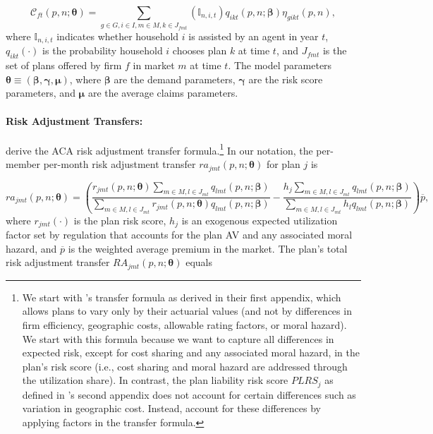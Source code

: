 \documentclass[12pt]{article}
\begin{document}
\vspace{-0.2in}		
\begin{equation*}
    \mathcal{C}_{ft}(\textit{p},\textit{n};\boldsymbol{\theta}) = \sum_{g \in G, i \in I, m\in M, k \in J_{fmt}} \left( \mathbb{I}_{n,i,t} \right)  q_{ikt}(\textit{p},\textit{n};\boldsymbol{\beta}) \eta_{gikt}(\textit{p},\textit{n}),
\end{equation*}
where $\mathbb{I}_{n,i,t}$ indicates whether household $i$ is assisted by an agent in year $t$, $q_{ikt}(\cdot)$ is the probability household $i$ chooses plan $k$ at time $t$, and $J_{fmt}$ is the set of plans offered by firm $f$ in market $m$ at time $t$.  The model parameters $\boldsymbol{\theta} \equiv (\boldsymbol{\beta},\boldsymbol{\gamma},\boldsymbol{\mu})$, where $\boldsymbol{\beta}$ are the demand parameters, $\boldsymbol{\gamma}$ are the risk score parameters, and $\boldsymbol{\mu}$ are the average claims parameters.


\paragraph{Risk Adjustment Transfers:} 
\citet{Pope2014} derive the ACA risk adjustment transfer formula.\footnote{We start with \citet{Pope2014}'s transfer formula as derived in their first appendix, which allows plans to vary only by their actuarial values (and not by differences in firm efficiency, geographic costs, allowable rating factors, or moral hazard).  We start with this formula because we want to capture all differences in expected risk, except for cost sharing and any associated moral hazard, in the plan's risk score (i.e., cost sharing and moral hazard are addressed through the utilization share).  In contrast, the plan liability risk score   $PLRS_j$ as defined in \citet{Pope2014}'s second appendix does not account for certain differences such as variation in geographic cost.  Instead, \citet{Pope2014} account for these differences by applying factors in the transfer formula.}  In our notation, the per-member per-month risk adjustment transfer $ra_{jmt}(\textit{p},\textit{n};\boldsymbol{\theta})$ for plan $j$ is

\vspace{-0.2in}
\begin{equation*}
	ra_{jmt}(\textit{p},\textit{n};\boldsymbol{\theta}) = \left(\frac{r_{jmt}(\textit{p},\textit{n};\boldsymbol{\theta})\sum_{m \in M, l \in J_{mt}} q_{lmt}(\textit{p},\textit{n};\boldsymbol{\beta})}{\sum_{m \in M, l \in J_{mt}} r_{jmt}(\textit{p},\textit{n};\boldsymbol{\theta}) q_{lmt}(\textit{p},\textit{n};\boldsymbol{\beta})}    -     \frac{h_j\sum_{m \in M, l \in J_{mt}} q_{lmt}(\textit{p},\textit{n};\boldsymbol{\beta})}{\sum_{m \in M, l \in J_{mt}} h_l q_{lmt}(\textit{p},\textit{n};\boldsymbol{\beta})}\right)\overline{p},
\end{equation*}
where $r_{jmt}(\cdot)$ is the plan risk score, $h_j$ is an exogenous expected utilization factor set by regulation that accounts for the plan AV and any associated moral hazard, and $\overline{p}$ is the weighted average premium in the market.  The plan's total risk adjustment transfer $RA_{jmt}(\textit{p},\textit{n};\boldsymbol{\theta})$ equals
\end{document}
